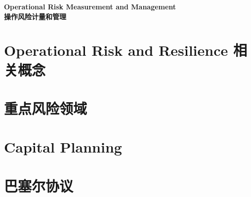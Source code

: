 \documentclass{article}
\begin{document}

\graphicspath{{images/}}

\begin{center}
\textbf{\Huge Operational Risk Measurement and Management}\\
\textbf{\Huge 操作风险计量和管理}\\
\end{center}


\section{Operational Risk and Resilience 相关概念}


\section{重点风险领域}


\section{Capital Planning}


\section{巴塞尔协议}


%

%
\end{document}
